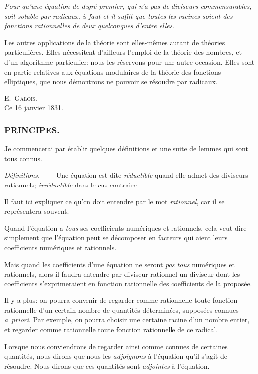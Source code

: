 \documentclass[leqno,12pt]{book}[2005/09/16]
\newcommand{\Subsection}[1]{\subsubsection*{\centering\small\normalfont #1}}
\newenvironment{Thm}{\itshape\ignorespaces}{\normalfont}
\newcommand{\Par}[1]{\medskip\par\textit{#1}\ ---\ \ignorespaces}
\newcommand{\Date}[2]{%
  \pagebreak[0]\par\hfill\textsc{#1}\mbox{\quad}\\
  \mbox{\quad}{\footnotesize #2}}
\begin{document}
\begin{Thm}
Pour qu'une équation de degré premier, qui n'a pas de diviseurs
commensurables, soit soluble par radicaux, il \emph{faut} et
il \emph{suffit} que toutes les racines soient des fonctions rationnelles
de deux quelconques d'entre elles.
\end{Thm}
\medskip

Les autres applications de la théorie sont elles-mêmes autant
de théories particulières. Elles nécessitent d'ailleurs l'emploi de
la théorie des nombres, et d'un algorithme particulier: nous les
réservons pour une autre occasion. Elles sont en partie relatives
aux équations modulaires de la théorie des fonctions elliptiques,
que nous démontrons ne pouvoir se résoudre par radicaux.
\Date{E.~Galois.}{Ce 16 janvier 1831.}


\Subsection{PRINCIPES.}

Je commencerai par établir quelques définitions et une suite de
lemmes qui sont tous connus.

\Par{Définitions.} Une équation est dite \emph{réductible} quand elle
admet des diviseurs rationnels; \emph{irréductible} dans le cas contraire.

Il faut ici expliquer ce qu'on doit entendre par le mot \emph{rationnel},
car il se représentera souvent.

Quand l'équation a \emph{tous} ses coefficients numériques et rationnels,
cela veut dire simplement que l'équation peut se décomposer
en facteurs qui aient leurs coefficients numériques et rationnels.

Mais quand les coefficients d'une équation ne seront \emph{pas tous}
numériques et rationnels, alors il faudra entendre par diviseur
rationnel un diviseur dont les coefficients s'exprimeraient en
fonction rationnelle des coefficients de la proposée.

Il y a plus: on pourra convenir de regarder comme rationnelle
toute fonction rationnelle d'un certain nombre de quantités déterminées,
supposées connues \textit{a~priori}. Par exemple, on pourra
choisir une certaine racine d'un nombre entier, et regarder comme
rationnelle toute fonction rationnelle de ce radical.

Lorsque nous conviendrons de regarder ainsi comme connues
de certaines quantités, nous dirons que nous les \emph{adjoignons} à
l'équation qu'il s'agit de résoudre. Nous dirons que ces quantités
sont \emph{adjointes} à l'équation.
\end{document}
